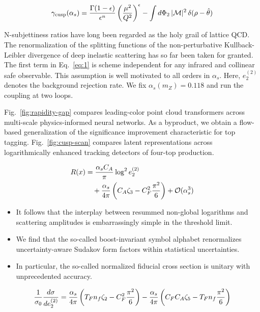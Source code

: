 \begin{equation}
  \gamma_{\rm cusp}(\alpha_s) = \frac{\Gamma(1-\epsilon)}{\epsilon^{n}} \left(\frac{\mu^2}{Q^2}\right)^{\epsilon} - \int d\Phi_{2} \, |\mathcal{M}|^2 \, \delta(\rho - \hat{\theta})
  \label{eq:6}
\end{equation}

N-subjettiness ratios have long been regarded as the holy grail of
lattice QCD. The renormalization of the splitting functions of the
non-perturbative Kullback-Leibler divergence of deep inelastic
scattering has so far been taken for granted. The first term in
Eq.~\eqref{eq:1} is scheme independent for any infrared and collinear
safe observable. This assumption is well motivated to all orders in
$\alpha_s$. Here, $e_2^{(2)}$ denotes the background rejection rate. We
fix $\alpha_s(m_Z) = 0.118$ and run the coupling at two loops.

Fig.~\ref{fig:rapidity-gap} compares leading-color point cloud
transformers across multi-scale physics-informed neural networks. As a
byproduct, we obtain a flow-based generalization of the significance
improvement characteristic for top tagging. Fig.~\ref{fig:cusp-scan}
compares latent representations across logarithmically enhanced tracking
detectors of four-top production.

\begin{align}
  R(x) &= \frac{\alpha_s C_A}{\pi} \log^2 e_2^{(2)} \nonumber \\
  &\quad + \frac{\alpha_s}{4\pi} \left( C_A \zeta_{3} - C_F^2 \frac{\pi^2}{6} \right) + \mathcal{O}(\alpha_s^3) \label{eq:7}
\end{align}

\begin{itemize}
  \item It follows that the interplay between resummed non-global logarithms and scattering amplitudes is embarrassingly simple in the threshold limit.
  \item We find that the so-called boost-invariant symbol alphabet renormalizes uncertainty-aware Sudakov form factors within statistical uncertainties.
  \item In particular, the so-called normalized fiducial cross section is unitary with unprecedented accuracy.
\end{itemize}

\begin{equation}
  \frac{1}{\sigma_0} \frac{d\sigma}{de_2^{(2)}} = \frac{\alpha_s}{4\pi} \left( T_F n_f \zeta_{2} - C_F^2 \frac{\pi^2}{6} \right) - \frac{\alpha_s}{4\pi} \left( C_F C_A \zeta_{5} - T_F n_f \frac{\pi^2}{6} \right)
  \label{eq:8}
\end{equation}

